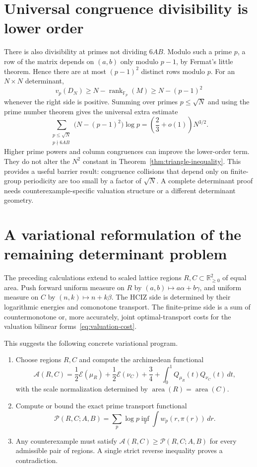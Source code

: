 \documentclass[11pt,oneside]{article}
\theoremstyle{definition}
\theoremstyle{remark}
\newcommand{\R}{\mathbb R}
\begin{document}
\section{Universal congruence divisibility is lower order}

There is also divisibility at primes not dividing $6AB$.  Modulo such a prime
$p$, a row of the matrix depends on $(a,b)$ only modulo $p-1$, by Fermat's
little theorem.  Hence there are at most $(p-1)^2$ distinct rows modulo $p$.
For an $N\times N$ determinant,
\[
 v_p(D_N)\ge N-\operatorname{rank}_{\mathbb F_p}(M)
 \ge N-(p-1)^2
\]
whenever the right side is positive.  Summing over primes $p\le\sqrt N$ and
using the prime number theorem gives the universal extra estimate
\begin{equation}\label{eq:congruence-gain}
 \sum_{\substack{p\le\sqrt N\\p\nmid6AB}}
  \bigl(N-(p-1)^2\bigr)\log p
 =\left(\frac23+o(1)\right)N^{3/2}.
\end{equation}
Higher prime powers and column congruences can improve the lower-order term.
They do not alter the $N^2$ constant in
Theorem~\ref{thm:triangle-inequality}.  This provides a useful barrier result:
congruence collisions that depend only on finite-group periodicity are too
small by a factor of $\sqrt N$.  A complete determinant proof needs
counterexample-specific valuation structure or a different determinant
geometry.

\section{A variational reformulation of the remaining determinant problem}

The preceding calculations extend to scaled lattice regions
$R,C\subset\R_{\ge0}^2$ of equal area.  Push forward uniform measure on $R$ by
$(a,b)\mapsto a\alpha+b\gamma$, and uniform measure on $C$ by
$(n,k)\mapsto n+k\beta$.  The HCIZ side is determined by their logarithmic
energies and comonotone transport.  The finite-prime side is a sum of
countermonotone or, more accurately, joint optimal-transport costs for the
valuation bilinear forms~\eqref{eq:valuation-cost}.

This suggests the following concrete variational program.
\begin{enumerate}
\item Choose regions $R,C$ and compute the archimedean functional
\[
 \mathcal A(R,C)=\frac12\mathcal E(\mu_R)
 +\frac12\mathcal E(\nu_C)+\frac34
 +\int_0^1Q_{\mu_R}(t)Q_{\nu_C}(t)\,dt,
\]
with the scale normalization determined by $\operatorname{area}(R)
=\operatorname{area}(C)$.
\item Compute or bound the exact prime transport functional
\[
 \mathcal P(R,C;A,B)=
 \sum_p\log p\inf_{\pi}
 \int w_p(r,\pi(r))\,dr.
\]
\item Any counterexample must satisfy
$\mathcal A(R,C)\ge\mathcal P(R,C;A,B)$ for every admissible pair of regions.
A single strict reverse inequality proves a contradiction.
\end{enumerate}
\end{document}
